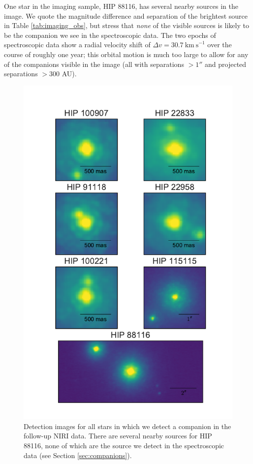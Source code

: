 \documentclass{emulateapj}
\begin{document}
One star in the imaging sample, HIP 88116, has several nearby sources in the image. We quote the magnitude difference and separation of the brightest source in Table \ref{tab:imaging_obs}, but stress that \emph{none} of the visible sources is likely to be the companion we see in the spectroscopic data. The two epochs of spectroscopic data show a radial velocity shift of $\Delta v = 30.7\ \mathrm{km\ s}^{-1}$ over the course of roughly one year; this orbital motion is much too large to allow for any of the companions visible in the image (all with separations $ > 1''$ and projected separations $ > 300$ AU).

\begin{figure}
\includegraphics[width=\columnwidth]{Imaging_Data.pdf}
\caption{Detection images for all stars in which we detect a companion in the follow-up NIRI data. 
There are several nearby sources for HIP 88116, none of which are the source we detect in the 
spectroscopic data (see Section \ref{sec:companions}).}
\label{fig:images}
\end{figure}
\end{document}
